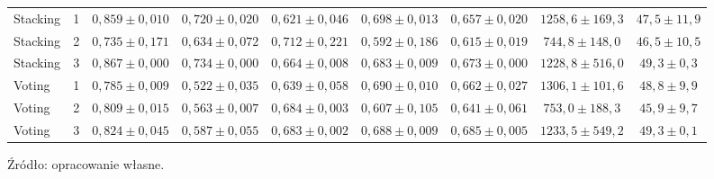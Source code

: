 \begin{table}[H]
{\begin{tabular}{llccccccc}
Stacking & 1 & $0{,}859 \pm 0{,}010$ & $0{,}720 \pm 0{,}020$ & $0{,}621 \pm 0{,}046$ & $0{,}698 \pm 0{,}013$ & $0{,}657 \pm 0{,}020$ & $1258{,}6 \pm 169{,}3$ & $47{,}5 \pm 11{,}9$ \\
Stacking & 2 & $0{,}735 \pm 0{,}171$ & $0{,}634 \pm 0{,}072$ & $0{,}712 \pm 0{,}221$ & $0{,}592 \pm 0{,}186$ & $0{,}615 \pm 0{,}019$ & $744{,}8 \pm 148{,}0$ & $46{,}5 \pm 10{,}5$ \\
Stacking & 3 & $0{,}867 \pm 0{,}000$ & $0{,}734 \pm 0{,}000$ & $0{,}664 \pm 0{,}008$ & $0{,}683 \pm 0{,}009$ & $0{,}673 \pm 0{,}000$ & $1228{,}8 \pm 516{,}0$ & $49{,}3 \pm 0{,}3$ \\
Voting & 1 & $0{,}785 \pm 0{,}009$ & $0{,}522 \pm 0{,}035$ & $0{,}639 \pm 0{,}058$ & $0{,}690 \pm 0{,}010$ & $0{,}662 \pm 0{,}027$ & $1306{,}1 \pm 101{,}6$ & $48{,}8 \pm 9{,}9$ \\
Voting & 2 & $0{,}809 \pm 0{,}015$ & $0{,}563 \pm 0{,}007$ & $0{,}684 \pm 0{,}003$ & $0{,}607 \pm 0{,}105$ & $0{,}641 \pm 0{,}061$ & $753{,}0 \pm 188{,}3$ & $45{,}9 \pm 9{,}7$ \\
Voting & 3 & $0{,}824 \pm 0{,}045$ & $0{,}587 \pm 0{,}055$ & $0{,}683 \pm 0{,}002$ & $0{,}688 \pm 0{,}009$ & $0{,}685 \pm 0{,}005$ & $1233{,}5 \pm 549{,}2$ & $49{,}3 \pm 0{,}1$ \\
\hline
\end{tabular}}
\end{table}

Źródło: opracowanie własne.